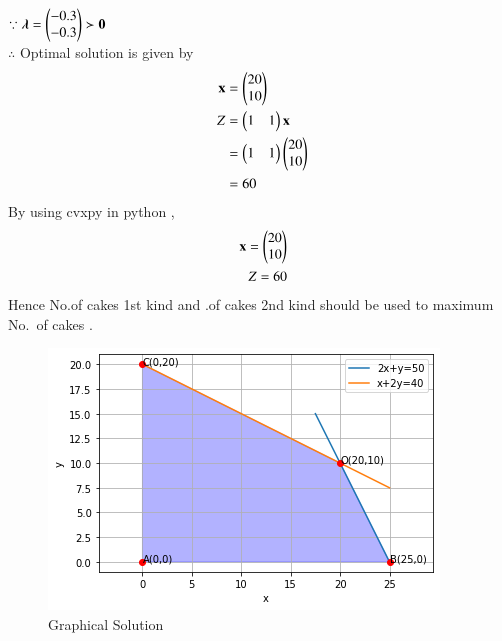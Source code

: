 \documentclass[journal,12pt,twocolumn]{IEEEtran}
\begin{document}
$\because \boldsymbol{\lambda}=\begin{pmatrix}-0.3 \\ -0.3\end{pmatrix} \succ \mathbf{0} $
\\
$\therefore$ Optimal solution is given by
\begin{align}
    \vec{x} &= \myvec{20\\10} \\
    Z &= \myvec{1& 1}\vec{x} \\
    &= \myvec{1 & 1}\myvec{20 \\ 10} \\
    &= 60
\end{align}
By using cvxpy in python ,
\begin{align}
    \vec{x}=\myvec{20\\10}\\
    Z = 60
\end{align}
Hence No.of cakes  1st kind and  .of cakes  2nd kind should be used to maximum No. of cakes .\\
\begin{figure}[!ht]
\centering
\includegraphics[width=\columnwidth]{Figure9.png}
\caption{Graphical Solution}
\label{fig: Graphical Solution}	
\end{figure}
\end{document}
